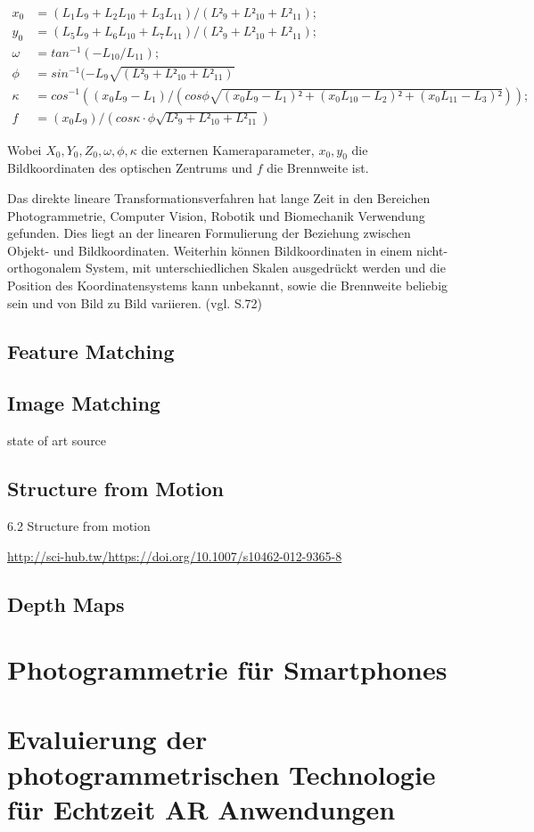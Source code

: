  \begin{equation}
 \begin{aligned}
 x_0 &= (L_1L_9 + L_2L_{10} + L_3L_{11})/(L²_9 + L²_{10} + L²_{11}); \\
 y_0 &= (L_5L_9 + L_6L_{10} + L_7L_{11})/(L²_9 + L²_{10} + L²_{11}); \\
 \omega &= tan^{-1}(-L_{10}/L_{11}); \\
 \phi &= sin^{-1}(-L_9 \sqrt{(L²_9 + L²_{10} + L²_{11})} \\
  \kappa &= cos^{-1}((x_0L_9 - L_1)/(cos \phi \sqrt{(x_0L_9-L_1)² + (x_0L_{10}-L_2)² + (x_0L_{11}-L_3)²})); \\
 f&=(x_0L_9)/(cos \kappa \cdot \phi \sqrt{L²_9 + L²_{10} + L²_{11}}) 
 \end{aligned}
 \end{equation}

Wobei $X_0,Y_0,Z_0,\omega ,\phi , \kappa $ die externen Kameraparameter, $x_0,y_0$ die Bildkoordinaten des optischen Zentrums und $f$ die Brennweite ist. 

Das direkte lineare Transformationsverfahren hat lange Zeit in den Bereichen Photogrammetrie, Computer Vision, Robotik und Biomechanik Verwendung gefunden. Dies liegt an der linearen Formulierung der Beziehung zwischen Objekt- und Bildkoordinaten. Weiterhin können Bildkoordinaten in einem nicht-orthogonalem System, mit unterschiedlichen Skalen ausgedrückt werden und die Position des Koordinatensystems kann unbekannt, sowie die Brennweite beliebig sein und von Bild zu Bild variieren. (vgl. \cite{dlt} S.72)



\subsection{Feature Matching}

\subsection{Image Matching}

state of art source

\subsection{Structure from Motion}

6.2 Structure from motion

\url{http://sci-hub.tw/https://doi.org/10.1007/s10462-012-9365-8}

\subsection{Depth Maps}

\section{Photogrammetrie für Smartphones}

\section{Evaluierung der photogrammetrischen Technologie für Echtzeit AR Anwendungen}